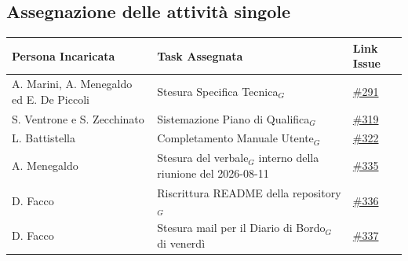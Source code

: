 \documentclass[a4paper, 10pt, colorlinks=true, linkcolor=black, urlcolor=blue, citecolor=blue, hidelinks]{article}
\newcommand{\issue}[1]{\href{https://github.com/thebitless-group-swe/thebitless.github.io/issues/#1}{\##1}}
\newcommand{\issueMVP}[1]{\href{https://github.com/thebitless-group-swe/MVP/issues/#1}{\##1}}
\begin{document}
\subsection{Assegnazione delle attività singole}
\begin{center}
    \renewcommand{\arraystretch}{1.4}
        \begin{tabular}{|p{4.2cm}|p{6.2cm}|p{2.2cm}|}
        \hline
        \textbf{Persona Incaricata} & \textbf{Task Assegnata} & \centering\textbf{Link Issue} \tabularnewline
        
        \hline
        A. Marini, A. Menegaldo ed E. De Piccoli & Stesura Specifica Tecnica$_G$  & \issue{291} \\
        \hline
        S. Ventrone e S. Zecchinato & Sistemazione Piano di Qualifica$_G$ & \issue{319} \\
        \hline
        L. Battistella & Completamento Manuale Utente$_G$ & \issue{322} \\
        \hline
        A. Menegaldo & Stesura del verbale$_G$ interno della riunione del 2026-08-11 & \issueMVP{335} \\
        \hline
        D. Facco & Riscrittura README della repository$_G$ & \issue{336} \\
        \hline
        D. Facco & Stesura mail per il Diario di Bordo$_G$ di venerdì & \issue{337} \\
        \hline
    \end{tabular}
\end{center}

\appendix
\end{document}
